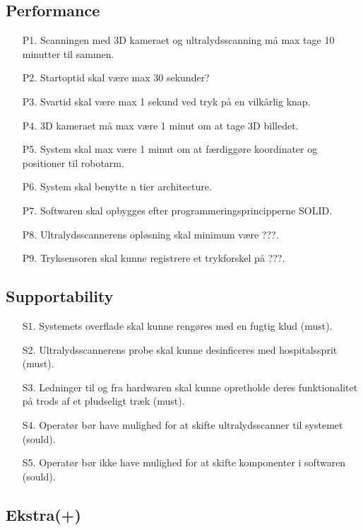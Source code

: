\subsection{Performance}
\begin{enumerate}
    \item[P1.] Scanningen med 3D kameraet og ultralydsscanning må max tage 10 minutter til sammen.  
    \item[P2.]  Startoptid skal være max 30 sekunder?
    \item[P3.] Svartid skal være max 1 sekund ved tryk på en vilkårlig knap. 
    \item[P4.] 3D kameraet må max være 1 minut om at tage 3D billedet. 
    \item[P5.] System skal max være 1 minut om at færdiggøre koordinater og positioner til robotarm. 
    \item[P6.] System skal benytte n tier architecture. 
    \item[P7.] Softwaren skal opbygges efter programmeringsprincipperne SOLID. 
    \item[P8.] Ultralydsscannerens opløsning skal minimum være ???. 
    \item[P9.] Tryksensoren skal kunne registrere et trykforskel på ???.
\end{enumerate}

\subsection{Supportability}
\begin{enumerate}
    \item[S1.] Systemets overflade skal kunne rengøres med en fugtig klud (must). 
    \item[S2.] Ultralydsscannerens probe skal kunne desinficeres med hospitalssprit (must). 
    \item[S3.] Ledninger til og fra hardwaren skal kunne opretholde deres funktionalitet på trods af et pludseligt træk (must). 
    \item[S4.] Operatør bør have mulighed for at skifte ultralydsscanner til systemet (sould).  
    \item[S5.] Operatør bør ikke have mulighed for at skifte komponenter i softwaren (sould).   
\end{enumerate}

\subsection{Ekstra(+)}\label{andrePlus}

